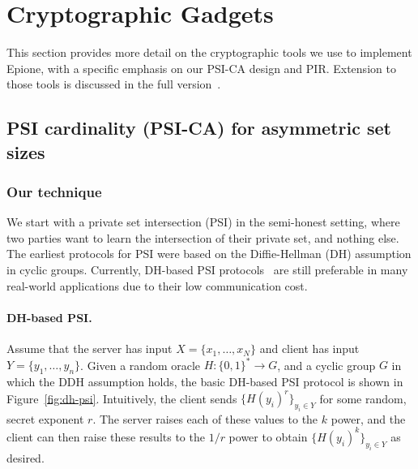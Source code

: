 \documentclass[11pt]{article} %
\newcommand{\figureref}[1]{Figure~\ref{#1}}
\newcommand{\dect}{\textsf{Epione}\xspace}
\newcommand{\psica}{PSI-CA\xspace}
\renewcommand\to{\ensuremath{\rightarrow}}
\newcommand{\G}{G }
\begin{document}
\section{Cryptographic Gadgets}
\label{sect:psi_prot}

This section provides more detail on the cryptographic tools we use to implement \dect, with a specific emphasis on our \psica design and PIR. Extension to those tools is discussed in the full version~\cite{epione}.

\subsection{PSI cardinality (PSI-CA) for asymmetric set sizes}
\label{subs:psica}


\subsubsection{Our technique}

We start with a private set intersection (PSI) in the semi-honest setting, where two parties want to learn the intersection of their private set, and nothing else. The earliest protocols for PSI were based on the Diffie-Hellman (DH) assumption in cyclic groups. Currently, DH-based PSI protocols~\cite{Huberman99} are still preferable in many real-world applications due to their low communication cost. 


\paragraph{DH-based PSI.}
Assume that the server has input $X = \{x_1, \ldots, x_{N}\}$ and client has input $Y = \{ y_1, \ldots, y_{n} \}$.  Given a random oracle $H : \{0,1\}^* \to \G$, and a cyclic group $\G$  in which the DDH assumption holds, the basic DH-based PSI protocol is shown in \figureref{fig:dh-psi}. Intuitively, the client sends $\{ H(y_i)^r \}_{y_i \in Y}$ for some random, secret exponent $r$. The server raises each of these values to the $k$ power, and the client can then raise these results to the $1/r$ power to obtain $\{ H(y_i)^k \}_{y_i \in Y}$ as desired.
\end{document}
